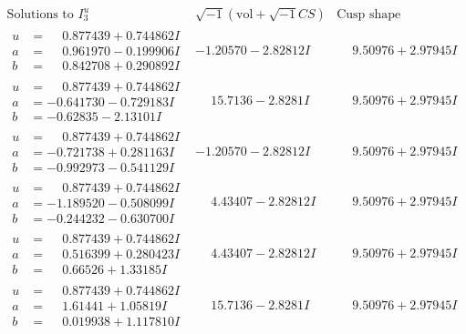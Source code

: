 \documentclass[1p]{elsarticle_modified}
\theoremstyle{definition}
\newcommand{\I}{\sqrt{-1}}
\begin{document}
$$\begin{array}{c|c|c}  
\text{Solutions to }I^u_{3}& \I (\text{vol} + \sqrt{-1}CS) & \text{Cusp shape}\\
 \hline 
\begin{aligned}
u &= \phantom{-}0.877439 + 0.744862 I \\
a &= \phantom{-}0.961970 - 0.199906 I \\
b &= \phantom{-}0.842708 + 0.290892 I\end{aligned}
 & -1.20570 - 2.82812 I & \phantom{-}9.50976 + 2.97945 I \\ \hline\begin{aligned}
u &= \phantom{-}0.877439 + 0.744862 I \\
a &= -0.641730 - 0.729183 I \\
b &= -0.62835 - 2.13101 I\end{aligned}
 & \phantom{-}15.7136 - 2.8281 I & \phantom{-}9.50976 + 2.97945 I \\ \hline\begin{aligned}
u &= \phantom{-}0.877439 + 0.744862 I \\
a &= -0.721738 + 0.281163 I \\
b &= -0.992973 - 0.541129 I\end{aligned}
 & -1.20570 - 2.82812 I & \phantom{-}9.50976 + 2.97945 I \\ \hline\begin{aligned}
u &= \phantom{-}0.877439 + 0.744862 I \\
a &= -1.189520 - 0.508099 I \\
b &= -0.244232 - 0.630700 I\end{aligned}
 & \phantom{-}4.43407 - 2.82812 I & \phantom{-}9.50976 + 2.97945 I \\ \hline\begin{aligned}
u &= \phantom{-}0.877439 + 0.744862 I \\
a &= \phantom{-}0.516399 + 0.280423 I \\
b &= \phantom{-}0.66526 + 1.33185 I\end{aligned}
 & \phantom{-}4.43407 - 2.82812 I & \phantom{-}9.50976 + 2.97945 I \\ \hline\begin{aligned}
u &= \phantom{-}0.877439 + 0.744862 I \\
a &= \phantom{-}1.61441 + 1.05819 I \\
b &= \phantom{-}0.019938 + 1.117810 I\end{aligned}
 & \phantom{-}15.7136 - 2.8281 I & \phantom{-}9.50976 + 2.97945 I \\ \hline\begin{aligned}

\end{aligned}
\end{array}$$
\end{document}
